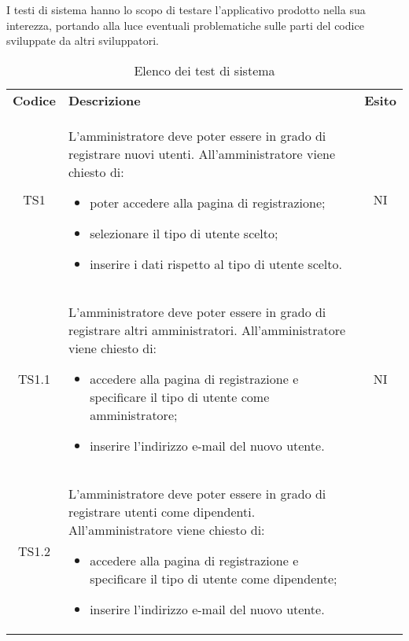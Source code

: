 I testi di sistema hanno lo scopo di testare l’applicativo prodotto nella sua interezza, portando alla luce eventuali problematiche sulle parti del codice sviluppate da altri sviluppatori.
\newpage
{
    \renewcommand{\arraystretch}{1.5}
    \centering
    \begin{longtable}{ c C{11cm} c }
        \caption{Elenco dei test di sistema}\\
        \rowcolor{\primaryColor}
        \textcolor{\secondaryColor}{
        \textbf{Codice}}     & \textcolor{\secondaryColor}
        {\textbf{Descrizione}} & \textcolor{\secondaryColor}{\textbf{Esito}} \\

        TS1&
        \begin{flushleft}
            L'amministratore deve poter essere in grado di registrare nuovi utenti.
            All'amministratore viene chiesto di:
        \end{flushleft}
        
        \begin{itemize}
            \item poter accedere alla pagina di registrazione;
            \item selezionare il tipo di utente scelto;
            \item inserire i dati rispetto al tipo di utente scelto.
            
        \end{itemize}&
        NI\\

      TS1.1&
      \begin{flushleft}
            L'amministratore deve poter essere in grado di registrare altri amministratori.
            All'amministratore viene chiesto di:
      \end{flushleft}
        \begin{itemize}
            \item accedere alla pagina di registrazione e specificare il tipo di utente come amministratore;
            \item inserire l'indirizzo e-mail del nuovo utente.
            
        \end{itemize}&
        NI\\

        TS1.2&
        \begin{flushleft}
            L'amministratore deve poter essere in grado di registrare utenti come dipendenti.
            All'amministratore viene chiesto di:
        \end{flushleft}
        \begin{itemize}
            \item accedere alla pagina di registrazione e specificare il tipo di utente come dipendente;
            \item inserire l'indirizzo e-mail del nuovo utente.
            

\end{itemize}
\end{longtable}}
